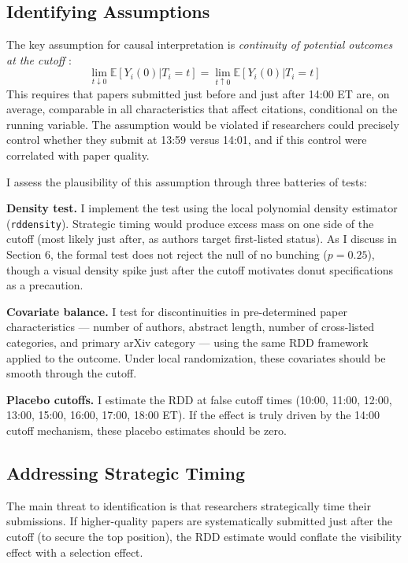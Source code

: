 \documentclass[12pt]{article}
\newcommand{\E}{\mathbb{E}}
\begin{document}
\subsection{Identifying Assumptions}

The key assumption for causal interpretation is \textit{continuity of potential outcomes at the cutoff} \citep{lee2010}:
\begin{equation}
\lim_{t \downarrow 0} \E[Y_i(0) | T_i = t] = \lim_{t \uparrow 0} \E[Y_i(0) | T_i = t]
\end{equation}
This requires that papers submitted just before and just after 14:00 ET are, on average, comparable in all characteristics that affect citations, conditional on the running variable. The assumption would be violated if researchers could precisely control whether they submit at 13:59 versus 14:01, and if this control were correlated with paper quality.

I assess the plausibility of this assumption through three batteries of tests:

\textbf{Density test.} I implement the \citet{mccrary2008} test using the \citet{cattaneo2020inference} local polynomial density estimator (\texttt{rddensity}). Strategic timing would produce excess mass on one side of the cutoff (most likely just after, as authors target first-listed status). As I discuss in Section 6, the formal test does not reject the null of no bunching ($p = 0.25$), though a visual density spike just after the cutoff motivates donut specifications as a precaution.

\textbf{Covariate balance.} I test for discontinuities in pre-determined paper characteristics --- number of authors, abstract length, number of cross-listed categories, and primary arXiv category --- using the same RDD framework applied to the outcome. Under local randomization, these covariates should be smooth through the cutoff.

\textbf{Placebo cutoffs.} I estimate the RDD at false cutoff times (10:00, 11:00, 12:00, 13:00, 15:00, 16:00, 17:00, 18:00 ET). If the effect is truly driven by the 14:00 cutoff mechanism, these placebo estimates should be zero.

\subsection{Addressing Strategic Timing}

The main threat to identification is that researchers strategically time their submissions. If higher-quality papers are systematically submitted just after the cutoff (to secure the top position), the RDD estimate would conflate the visibility effect with a selection effect.
\end{document}
